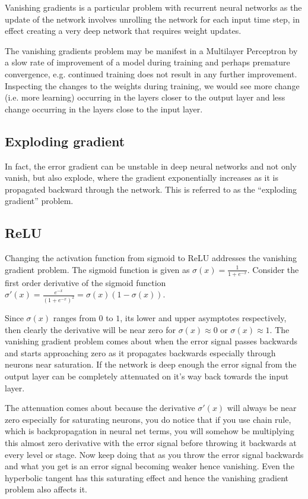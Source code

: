 \documentclass{article}
\begin{document}
Vanishing gradients is a particular problem with recurrent neural networks as the update of the network involves unrolling the network for each input time step, in effect creating a very deep network that requires weight updates.

The vanishing gradients problem may be manifest in a Multilayer Perceptron by a slow rate of improvement of a model during training and perhaps premature convergence, e.g. continued training does not result in any further improvement. Inspecting the changes to the weights during training, we would see more change (i.e. more learning) occurring in the layers closer to the output layer and less change occurring in the layers close to the input layer.

\subsection{Exploding gradient}

In fact, the error gradient can be unstable in deep neural networks and not only vanish, but also explode, where the gradient exponentially increases as it is propagated backward through the network. This is referred to as the ``exploding gradient'' problem.

\subsection{ReLU}
Changing the activation function from sigmoid to ReLU addresses the vanishing gradient problem.
The sigmoid function is given as $\sigma(x) = \frac{1}{1 + e^{-x}}$.  Consider the first order derivative of the sigmoid function $\sigma'(x) = \frac{e^{-x}}{(1 + e^{-x})^2} = \sigma(x)(1-\sigma(x))$.

Since  $\sigma(x)$  ranges from $0$ to $1$, its lower and upper asymptotes respectively, then clearly the derivative will be near zero for $\sigma(x) \approx 0$ or $\sigma(x) \approx 1$. The vanishing gradient problem comes about when the error signal passes backwards and starts approaching zero as it propagates backwards especially through neurons near saturation. If the network is deep enough the error signal from the output layer can be completely attenuated on it's way back towards the input layer.

The attenuation comes about because the derivative $\sigma'(x)$ will always be near zero especially for saturating neurons, you do notice that if you use chain rule, which is backpropagation in neural net terms, you will somehow be multiplying this almost zero derivative with the error signal before throwing it backwards at every level or stage. Now keep doing that as you throw the error signal backwards and what you get is an error signal becoming weaker hence vanishing. Even the hyperbolic tangent has this saturating effect and hence the vanishing gradient problem also affects it.
\end{document}

